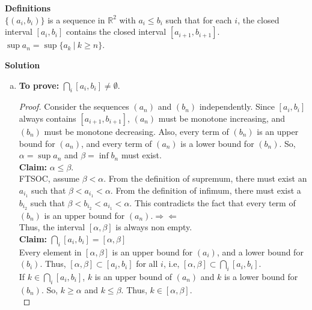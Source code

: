 \documentclass[12pt]{article}
\begin{document}
\section{}
 {\bf Definitions}\\
$\{ (a_{i}, b_{i}) \}$ is a sequence in $\mathbb{R}^{2}$ with $a_{i}\le b_{i}$ such that for each $i$, the closed interval $[a_{i}, b_{i}]$ contains the closed interval $[a_{i+1}, b_{i+1}]$.\\
$\sup a_{n} = \sup \{ a_{k}\ |\ k\ge n\}$.

      {\bf Solution}
\begin{enumerate}[(a)]
      \item {\bf To prove: }$\bigcap_{i}[a_{i}, b_{i}]\ne \emptyset$.
            \begin{proof}
                  Consider the sequences $(a_{n})$ and $(b_{n})$ independently.
                  Since $[a_{i}, b_{i}]$ always contains $[a_{i+1}, b_{i+1}]$, $(a_{n})$
                  must be monotone increasing, and $(b_{n})$ must be monotone decreasing.
                  Also, every term of $(b_{n})$ is an upper bound for $(a_{n})$, and
                  every term of $(a_{n})$ is a lower bound for $(b_{n})$. So,
                  $\alpha = \sup a_{n}$ and $\beta = \inf b_{n}$ must exist.\\

                  {\bf Claim: }$\alpha\leq \beta$.\\
                  FTSOC, assume $\beta<\alpha$. From the definition of supremum,
                  there must exist an $a_{i_{1}}$ such that $\beta<a_{i_{1}}<\alpha$.
                  From the definition of infimum, there must exist a $b_{i_{2}}$ such
                  that $\beta <b_{i_{2}}<a_{i_{1}}<\alpha$. This contradicts the fact that
                  every term of $(b_{n})$ is an upper bound for $(a_{n})$.\hfill $\Rightarrow\Leftarrow$\\

                  Thus, the interval $[\alpha, \beta]$ is always non empty.\\

                  {\bf Claim: }$\bigcap_{i}[a_{i}, b_{i}]= [\alpha, \beta]$\\
                  Every element in $[\alpha, \beta]$ is an upper bound for $(a_{i})$,
                  and a lower bound for $(b_{i})$. Thus, $[\alpha, \beta]\subset[a_{i}, b_{i}]$
                  for all $i$, i.e, $[\alpha, \beta]\subset \bigcap_{i}[a_{i}, b_{i}]$.\\
                  If $k\in \bigcap_{i}[a_{i}, b_{i}]$, $k$ is an upper bound of $(a_{n})$
                  and $k$ is a lower bound for $(b_{n})$. So, $k\ge \alpha$ and $k\le \beta$.
                  Thus, $k \in [\alpha, \beta]$.\\


\end{proof}
\end{enumerate}
\end{document}
